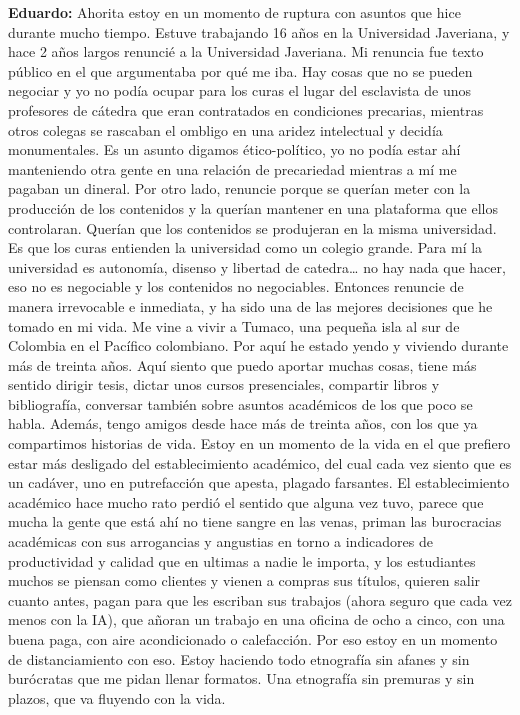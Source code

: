\documentclass[
]{interact}
\begin{document}
\textbf{Eduardo:} Ahorita estoy en un momento de ruptura con asuntos que
hice durante mucho tiempo. Estuve trabajando 16 años en la Universidad
Javeriana, y hace 2 años largos renuncié a la Universidad Javeriana. Mi
renuncia fue texto público en el que argumentaba por qué me iba. Hay
cosas que no se pueden negociar y yo no podía ocupar para los curas el
lugar del esclavista de unos profesores de cátedra que eran contratados
en condiciones precarias, mientras otros colegas se rascaban el ombligo
en una aridez intelectual y decidía monumentales. Es un asunto digamos
ético-político, yo no podía estar ahí manteniendo otra gente en una
relación de precariedad mientras a mí me pagaban un dineral. Por otro
lado, renuncie porque se querían meter con la producción de los
contenidos y la querían mantener en una plataforma que ellos
controlaran. Querían que los contenidos se produjeran en la misma
universidad. Es que los curas entienden la universidad como un colegio
grande. Para mí la universidad es autonomía, disenso y libertad de
catedra\ldots{} no hay nada que hacer, eso no es negociable y los
contenidos no negociables. Entonces renuncie de manera irrevocable e
inmediata, y ha sido una de las mejores decisiones que he tomado en mi
vida. Me vine a vivir a Tumaco, una pequeña isla al sur de Colombia en
el Pacífico colombiano. Por aquí he estado yendo y viviendo durante más
de treinta años. Aquí siento que puedo aportar muchas cosas, tiene más
sentido dirigir tesis, dictar unos cursos presenciales, compartir libros
y bibliografía, conversar también sobre asuntos académicos de los que
poco se habla. Además, tengo amigos desde hace más de treinta años, con
los que ya compartimos historias de vida. Estoy en un momento de la vida
en el que prefiero estar más desligado del establecimiento académico,
del cual cada vez siento que es un cadáver, uno en putrefacción que
apesta, plagado farsantes. El establecimiento académico hace mucho rato
perdió el sentido que alguna vez tuvo, parece que mucha la gente que
está ahí no tiene sangre en las venas, priman las burocracias académicas
con sus arrogancias y angustias en torno a indicadores de productividad
y calidad que en ultimas a nadie le importa, y los estudiantes muchos se
piensan como clientes y vienen a compras sus títulos, quieren salir
cuanto antes, pagan para que les escriban sus trabajos (ahora seguro que
cada vez menos con la IA), que añoran un trabajo en una oficina de ocho
a cinco, con una buena paga, con aire acondicionado o calefacción. Por
eso estoy en un momento de distanciamiento con eso. Estoy haciendo todo
etnografía sin afanes y sin burócratas que me pidan llenar formatos. Una
etnografía sin premuras y sin plazos, que va fluyendo con la vida.
\end{document}
